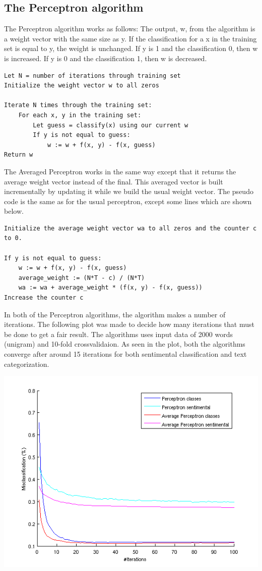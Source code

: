 \subsection{The Perceptron algorithm}
The Perceptron algorithm works as follows: 
The output, w, from the algorithm is a weight vector with the same size as y. If the classification for a x in the training set is equal to y, the weight is unchanged.
If y is 1 and the classification 0, then w is increased. If y is 0 and the classification 1, then w is decreased. \citep{perceptron_ai}
\begin{verbatim}
Let N = number of iterations through training set
Initialize the weight vector w to all zeros

Iterate N times through the training set:
    For each x, y in the training set:
        Let guess = classify(x) using our current w
        If y is not equal to guess:
            w := w + f(x, y) - f(x, guess)
Return w
\end{verbatim}
The Averaged Perceptron works in the same way except that it returns the average weight vector instead of the final.
This averaged vector is built incrementally by updating it while we build the usual weight vector. The pseudo code is the same as for the usual perceptron, except some lines which are shown below.
\begin{verbatim}
Initialize the average weight vector wa to all zeros and the counter c to 0.

If y is not equal to guess:
    w := w + f(x, y) - f(x, guess)
    average_weight := (N*T - c) / (N*T)
    wa := wa + average_weight * (f(x, y) - f(x, guess))
Increase the counter c
\end{verbatim}
In both of the Perceptron algorithms, the algorithm makes a number of iterations. The following plot was made to decide how many iterations that must be done to get a fair result. The algorithms uses input data of 2000 words (unigram) and 10-fold crossvalidaion. As seen in the plot, both the algorithms converge after around 15 iterations for both sentimental classification and text categorization.
\begin{center}
\includegraphics[scale = 0.8]{fig/perceptron_2000words_unigram_10foldcv_classes-high_sentimental-low.png}
\end{center}

